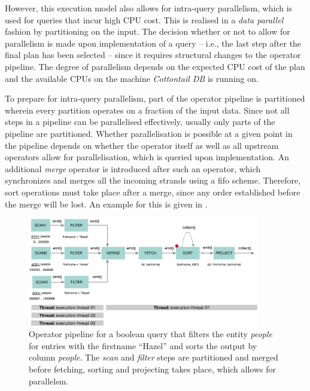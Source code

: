 However, this execution model also allows for intra-query parallelism, which is used for queries that incur high CPU cost. This is realised in a \emph{data parallel} fashion by partitioning on the input. The decision whether or not to allow for parallelism is made upon implementation of a query -- i.e., the last step after the final plan has been selected -- since it requires structural changes to the operator pipeline. The degree of parallelism depends on the expected CPU cost of the plan and the available CPUs on the machine \emph{Cottontail DB} is running on.

To prepare for intra-query parallelism, part of the operator pipeline is partitioned wherein every partition operates on a fraction of the input data. Since not all steps in a pipeline can be parallelised effectively, usually only parts of the pipeline are partitioned. Whether parallelisation is possible at a given point in the pipeline depends on whether the operator itself as well as all upstream operators allow for parallelisation, which is queried upon implementation. An additional \emph{merge} operator is introduced after such an operator, which synchronizes and merges all the incoming strands using a \acrshort{fifo} scheme. Therefore, sort operations must take place after a merge, since any order established before the merge will be lost. An example for this is given in .

\begin{figure}[bt]
    \centering
    \includegraphics[width=0.9\textwidth]{figures/execution-model-parallel}
    \caption{Operator pipeline for a boolean query that filters the entity \emph{people} for entries with the firstname ``Hazel'' and sorts the output by column \emph{people}. The \emph{scan} and \emph{filter} steps are partitioned and merged before fetching, sorting and projecting takes place, which allows for parallelsm.}
    \label{figure:cottontail_execution_model_parallel}
\end{figure}

